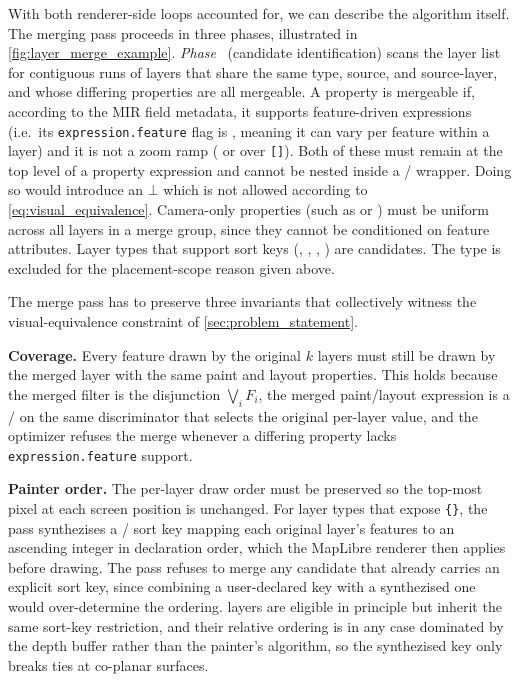 With both renderer-side loops accounted for, we can describe the algorithm itself.
The merging pass proceeds in three phases, illustrated in \cref{fig:layer_merge_example}.
\emph{Phase}~ (candidate identification) scans the layer list for contiguous runs of layers that share the same type, source, and source-layer, and whose differing properties are all mergeable.
A property is mergeable if, according to the MIR field metadata,
  it supports feature-driven expressions (i.e.\ its \texttt{expression.feature} flag is , meaning it can vary per feature within a layer) and
  it is not a zoom ramp ( or  over \texttt{[]}).
  Both of these must remain at the top level of a property expression and cannot be nested inside a /  wrapper.
Doing so would introduce an $\bot$ which is not allowed according to \cref{eq:visual_equivalence}.
Camera-only properties (such as \texttt{} or \texttt{}) must be uniform across all layers in a merge group, since they cannot be conditioned on feature attributes.
Layer types that support sort keys (\texttt{}, \texttt{}, \texttt{}, \texttt{}) are candidates.
The \texttt{} type is excluded for the placement-scope reason given above.

The merge pass has to preserve three invariants that collectively witness the visual-equivalence constraint of \cref{sec:problem_statement}.

\textbf{Coverage.}
Every feature drawn by the original $k$ layers must still be drawn by the merged layer with the same paint and layout properties.
This holds because the merged filter is the disjunction $\bigvee_i F_i$, the merged paint/layout expression is a / on the same discriminator that selects the original per-layer value, and the optimizer refuses the merge whenever a differing property lacks \texttt{expression.feature} support.

\textbf{Painter order.}
The per-layer draw order must be preserved so the top-most pixel at each screen position is unchanged.
For layer types that expose \texttt{\{\}}, the pass synthezises a / sort key mapping each original layer's features to an ascending integer in declaration order, which the MapLibre renderer then applies before drawing.
The pass refuses to merge any candidate that already carries an explicit sort key, since combining a user-declared key with a synthezised one would over-determine the ordering.
\texttt{} layers are eligible in principle but inherit the same sort-key restriction, and their relative ordering is in any case dominated by the depth buffer rather than the painter's algorithm, so the synthezised key only breaks ties at co-planar surfaces.

